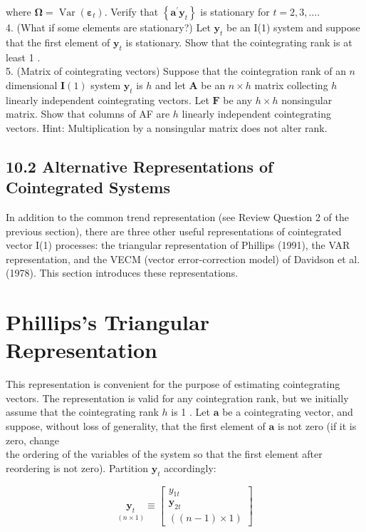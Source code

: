 \documentclass[10pt]{article}
\begin{document}
where $\boldsymbol{\Omega}=\operatorname{Var}\left(\boldsymbol{\varepsilon}_{t}\right)$. Verify that $\left\{\mathbf{a}^{\prime} \mathbf{y}_{t}\right\}$ is stationary for $t=2,3, \ldots$.\\
4. (What if some elements are stationary?) Let $\mathbf{y}_{t}$ be an I(1) system and suppose that the first element of $\mathbf{y}_{t}$ is stationary. Show that the cointegrating rank is at least 1 .\\
5. (Matrix of cointegrating vectors) Suppose that the cointegration rank of an $n$ dimensional $\mathbf{I}(1)$ system $\mathbf{y}_{t}$ is $h$ and let $\mathbf{A}$ be an $n \times h$ matrix collecting $h$ linearly independent cointegrating vectors. Let $\mathbf{F}$ be any $h \times h$ nonsingular matrix. Show that columns of AF are $h$ linearly independent cointegrating vectors. Hint: Multiplication by a nonsingular matrix does not alter rank.

\subsection*{10.2 Alternative Representations of Cointegrated Systems}
In addition to the common trend representation (see Review Question 2 of the previous section), there are three other useful representations of cointegrated vector I(1) processes: the triangular representation of Phillips (1991), the VAR representation, and the VECM (vector error-correction model) of Davidson et al. (1978). This section introduces these representations.

\section*{Phillips's Triangular Representation}
This representation is convenient for the purpose of estimating cointegrating vectors. The representation is valid for any cointegration rank, but we initially assume that the cointegrating rank $h$ is 1 . Let $\mathbf{a}$ be a cointegrating vector, and suppose, without loss of generality, that the first element of $\mathbf{a}$ is not zero (if it is zero, change\\
the ordering of the variables of the system so that the first element after reordering is not zero). Partition $\mathbf{y}_{t}$ accordingly:

\[
\underset{(n \times 1)}{\mathbf{y}_{t}} \equiv\left[\begin{array}{c}
y_{1 t}  \tag{10.2.1}\\
\mathbf{y}_{2 t} \\
((n-1) \times 1)
\end{array}\right]
\]
\end{document}
